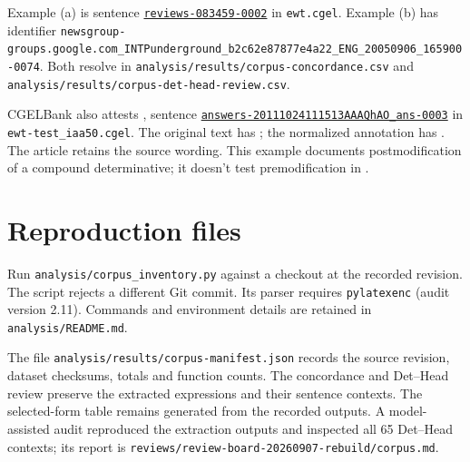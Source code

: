 \documentclass[12pt]{article}
\begin{document}
Example (a) is sentence \href{https://github.com/nert-nlp/cgel/blob/d0a2c2d8c522b23d5aa879fc9cb94948f4285b2c/datasets/ewt.cgel\#L651-L654}{\nolinkurl{reviews-083459-0002}} in \nolinkurl{ewt.cgel}. Example (b) has identifier \nolinkurl{newsgroup-groups.google.com_INTPunderground_b2c62e87877e4a22_ENG_20050906_165900-0074}. Both resolve in \nolinkurl{analysis/results/corpus-concordance.csv} and \nolinkurl{analysis/results/corpus-det-head-review.csv}.

CGELBank also attests , sentence \href{https://github.com/nert-nlp/cgel/blob/d0a2c2d8c522b23d5aa879fc9cb94948f4285b2c/datasets/ewt-test_iaa50.cgel\#L179-L181}{\nolinkurl{answers-20111024111513AAAQhAO_ans-0003}} in \nolinkurl{ewt-test_iaa50.cgel}. The original text has ; the normalized annotation has . The article retains the source wording. This example documents postmodification of a compound determinative; it doesn't test premodification in .

\section{Reproduction files}

Run \nolinkurl{analysis/corpus_inventory.py} against a checkout at the recorded revision. The script rejects a different Git commit. Its parser requires \texttt{pylatexenc} (audit version 2.11). Commands and environment details are retained in \nolinkurl{analysis/README.md}.

The file \nolinkurl{analysis/results/corpus-manifest.json} records the source revision, dataset checksums, totals and function counts. The concordance and Det--Head review preserve the extracted expressions and their sentence contexts. The selected-form table remains generated from the recorded outputs. A model-assisted audit reproduced the extraction outputs and inspected all 65 Det--Head contexts; its report is \nolinkurl{reviews/review-board-20260907-rebuild/corpus.md}.

\printbibliography
\end{document}

